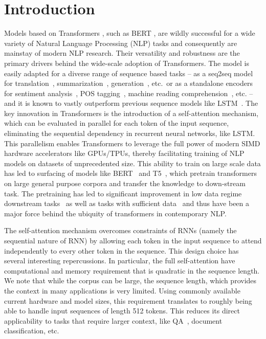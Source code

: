 \documentclass{article}
\begin{document}
\section{Introduction}
Models based on Transformers \citep{vaswani2017attention}, such as BERT \citep{devlin2018bert,liu2019roberta}, 
are wildly successful for a wide variety of Natural Language Processing (NLP) tasks and consequently are mainstay of modern NLP research. 
Their versatility and robustness are the primary drivers behind the wide-scale adoption of Transformers. 
The model is easily adapted for a diverse range of sequence based tasks -- as a seq2seq model for translation~\citep{vaswani2017attention}, summarization~\citep{miller2019leveraging}, generation~\citep{chen2019distilling}, etc.~or as a standalone encoders for sentiment analysis~\citep{sun2019utilizing}, POS tagging~\citep{martin2019camembert}, machine reading comprehension~\citep{wang2019multi}, etc. -- and it is known to vastly outperform previous 
sequence models like LSTM~\citep{hochreiter1997long}.
The key innovation in Transformers is the introduction of a self-attention mechanism, which can be evaluated in parallel for each token of the input sequence, eliminating the sequential dependency in recurrent neural networks, like LSTM.
This parallelism enables Transformers to leverage the full power of modern SIMD hardware accelerators like GPUs/TPUs, thereby facilitating training of NLP models on datasets of unprecedented size.
This ability to train on large scale data has led to surfacing of models like BERT~\citep{devlin2018bert} and T5~\citep{raffel2019exploring}, which pretrain transformers on large general purpose corpora and transfer the knowledge to down-stream task. The pretraining has led to significant improvement in low data regime downstream tasks~\citep{kumar2020data} as well as tasks with sufficient data~\citep{yang2019xlnet} and thus have been a major force behind the ubiquity of transformers in contemporary NLP.

The self-attention mechanism  overcomes  constraints of RNNs (namely the sequential nature of RNN)
by allowing each token in the input sequence to attend independently to every other token 
in the sequence.    This design choice has several interesting repercussions.
In particular, the full self-attention have computational and memory requirement that 
is quadratic in the sequence length. We note that while the corpus can be large, the sequence length, which provides the context in many applications is very limited. 
Using commonly available current hardware and model sizes, this 
requirement translates to roughly being able to handle input sequences of length 512 tokens. 
This reduces its direct applicability to tasks that require larger context, 
like QA~\citep{lin2003makes}, document classification, etc.
\end{document}
